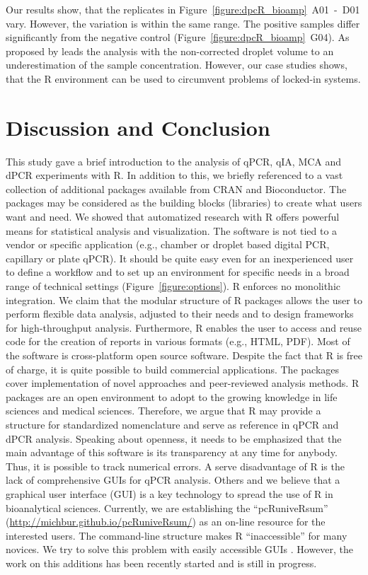 Our results show, that the replicates in 
Figure~\ref{figure:dpcR_bioamp}~A01~-~D01 vary. However, the variation is within 
the same range. The positive samples differ significantly from the negative 
control (Figure~\ref{figure:dpcR_bioamp}~G04). As proposed by 
\citet{corbisier_2015} leads the analysis with the non-corrected droplet volume 
to an underestimation of the sample concentration. However, our case studies 
shows, that the R environment can be used to circumvent problems of locked-in 
systems.

\section{Discussion and Conclusion}

This study gave a brief introduction to the analysis of qPCR, qIA, MCA and dPCR 
experiments with R. In addition to this, we briefly referenced to a vast 
collection of 
additional packages available from CRAN and Bioconductor. The packages may be 
considered as the building blocks (libraries) to create what users want and 
need. We 
showed that automatized research with R offers powerful means for statistical 
analysis and visualization. The software is not tied to a vendor or specific 
application (e.g., chamber or droplet based digital PCR, capillary or plate 
qPCR). It should be quite easy even for an inexperienced user to define a 
workflow and to set up an environment for specific needs in a broad range of 
technical settings (Figure~\ref{figure:options}). R enforces no monolithic 
integration. We claim that the modular structure of R packages allows the user 
to 
perform flexible data analysis, adjusted to their needs and to design 
frameworks 
for high-throughput analysis. Furthermore, R enables the user to access and 
reuse code for the creation 
of reports in various formats (e.g., HTML, PDF). Most of the software is 
cross-platform open source software. Despite the fact that R is free of charge, 
it is quite possible to build commercial applications. The packages cover 
implementation of novel approaches and peer-reviewed analysis methods. R 
packages are an open environment to adopt to the growing knowledge in life 
sciences and medical sciences. Therefore, we argue that R may provide a 
structure for standardized nomenclature and serve as reference in qPCR and dPCR 
analysis. Speaking about openness, it needs to be emphasized that the main 
advantage of this software is its transparency at any time for anybody. Thus, 
it is 
possible to track numerical errors.  A serve disadvantage of R is the lack of 
comprehensive GUIs for qPCR analysis. Others and we believe that a graphical 
user 
interface (GUI) is a key technology to spread the use of R in bioanalytical 
sciences. Currently, we are establishing the ``pcRuniveRsum'' 
(\url{http://michbur.github.io/pcRuniveRsum/}) as an on-line resource for the
interested users. The command-line structure makes R ``inaccessible'' for many 
novices. We try to solve this problem with easily accessible 
GUIs \citep{rodiger_rkward_2012}. However, the work on this additions has been 
recently started and is still in progress.


